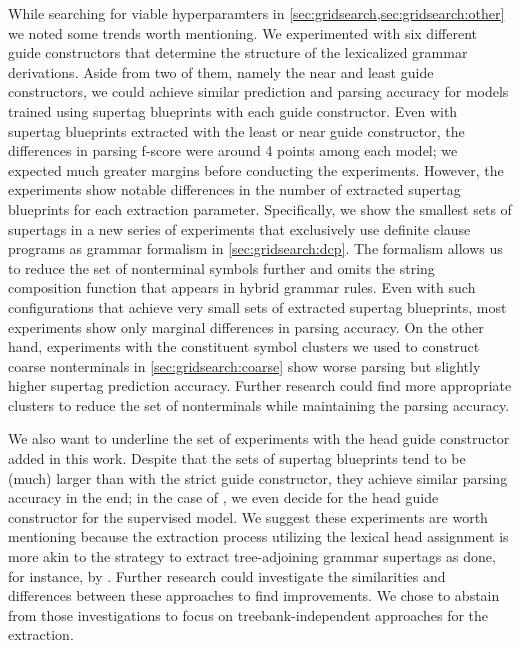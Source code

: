 \documentclass[../document.tex]{subfiles}
\begin{document}
    While searching for viable hyperparamters in \cref{sec:gridsearch,sec:gridsearch:other} we noted some trends worth mentioning.
    We experimented with six different guide constructors that determine the structure of the lexicalized grammar derivations. Aside from two of them, namely the near and least guide constructors, we could achieve similar prediction and parsing accuracy for models trained using supertag blueprints with each guide constructor.
    Even with supertag blueprints extracted with the least or near guide constructor, the differences in parsing f-score were around 4 points among each model; we expected much greater margins before conducting the experiments.
    However, the experiments show notable differences in the number of extracted supertag blueprints for each extraction parameter.
    Specifically, we show the smallest sets of supertags in a new series of experiments that exclusively use definite clause programs as grammar formalism in \cref{sec:gridsearch:dcp}.
    The formalism allows us to reduce the set of nonterminal symbols further and omits the string composition function that appears in hybrid grammar rules.
    Even with such configurations that achieve very small sets of extracted supertag blueprints, most experiments show only marginal differences in parsing accuracy.
    On the other hand, experiments with the constituent symbol clusters we used to construct coarse nonterminals in \cref{sec:gridsearch:coarse} show worse parsing but slightly higher supertag prediction accuracy.
    Further research could find more appropriate clusters to reduce the set of nonterminals while maintaining the parsing accuracy.

    We also want to underline the set of experiments with the head guide constructor added in this work.
    Despite that the sets of supertag blueprints tend to be (much) larger than with the strict guide constructor, they achieve similar parsing accuracy in the end; in the case of , we even decide for the head guide constructor for the supervised model.
    We suggest these experiments are worth mentioning because the extraction process utilizing the lexical head assignment is more akin to the strategy to extract tree-adjoining grammar supertags as done, for instance, by \cite{Kaeshammer2012GermanAE, Bla18}.
    Further research could investigate the similarities and differences between these approaches to find improvements.
    We chose to abstain from those investigations to focus on treebank-independent approaches for the extraction.
\end{document}
